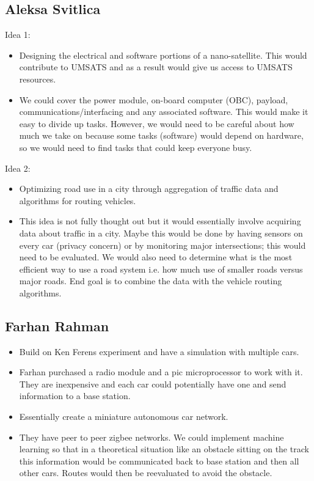 \documentclass[a4paper]{article}
\begin{document}
	\subsection{Aleksa Svitlica}
	Idea 1:
	\begin{itemize}
		\item Designing the electrical and software portions of a nano-satellite. This would contribute to UMSATS and as a result would give us access to UMSATS resources.
		\item We could cover the power module, on-board computer (OBC), payload, communications/interfacing and any associated software. This would make it easy to divide up tasks. However, we would need to be careful about how much we take on because some tasks (software) would depend on hardware, so we would need to find tasks that could keep everyone busy.
	\end{itemize}
	Idea 2:
	\begin{itemize}
		\item Optimizing road use in a city through aggregation of traffic data and algorithms for routing vehicles.
		\item This idea is not fully thought out but it would essentially involve acquiring data about traffic in a city. Maybe this would be done by having sensors on every car (privacy concern) or by monitoring major intersections; this would need to be evaluated. We would also need to determine what is the most efficient way to use a road system i.e. how much use of smaller roads versus major roads. End goal is to combine the data with the vehicle routing algorithms.
	\end{itemize}

	\subsection{Farhan Rahman}
	\begin{itemize}
		\item Build on Ken Ferens experiment and have a simulation with multiple cars.
		\item Farhan purchased a radio module and a pic microprocessor to work with it. They are inexpensive and each car could potentially have one and send information to a base station.
		\item Essentially create a miniature autonomous car network.
		\item They have peer to peer zigbee networks. We could implement machine learning so that in a theoretical situation like an obstacle sitting on the track this information would be communicated back to base station and then all other cars. Routes would then be reevaluated to avoid the obstacle.
	\end{itemize}
\end{document}
